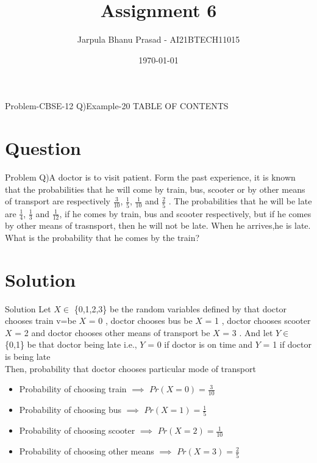 \documentclass{beamer}
\title{Assignment 6}
\author{Jarpula Bhanu Prasad - AI21BTECH11015}
\date{\today}
\begin{document}
\begin{frame}
    \titlepage 
\end{frame}

\logo{}


\begin{frame}{Problem-CBSE-12 Q)Example-20}
TABLE OF CONTENTS
    \tableofcontents
\end{frame}


\section{Question}
\begin{frame}{Problem}
Q)A doctor is to visit patient. Form the past experience, it is known that the probabilities that he will come by train, bus, scooter or by other means of transport are respectively $\frac{3}{10}$, $\frac{1}{5}$, $\frac{1}{10}$ and $\frac{2}{5}$ . The probabilities that he will be late are $\frac{1}{4}$, $\frac{1}{3}$ and $\frac{1}{12}$, if he comes by train, bus and scooter respectively, but if he comes by other means of trasnsport, then he will not be late. When he arrives,he is late. What is the probability that he comes by the train?
\end{frame}

\section{Solution}
\begin{frame}{Solution}
 Let $X \in$ \{0,1,2,3\} be the random variables defined by that doctor chooses train v=be $X$ = 0 , doctor chooses bus be $X$ = 1 , doctor chooses scooter $X$ = 2 and doctor chooses other means of transport be $X$ = 3 . And let $Y \in$ \{0,1\} be that doctor being late i.e., $Y$ = 0 if doctor is on time and $Y$ = 1 if doctor is being late\\
Then, probability that doctor chooses particular mode of transport
\begin{itemize}
    \item Probability of choosing train $\implies$ $Pr(X=0) = \frac{3}{10}$ 
    \item Probability of choosing bus $\implies$ $Pr(X=1) = \frac{1}{5}$
    \item Probability of choosing scooter $\implies$ $Pr(X=2) = \frac{1}{10}$ 
    \item Probability of choosing other means $\implies$ $Pr(X=3) = \frac{2}{5}$
\end{itemize}
\end{frame}
\end{document}
